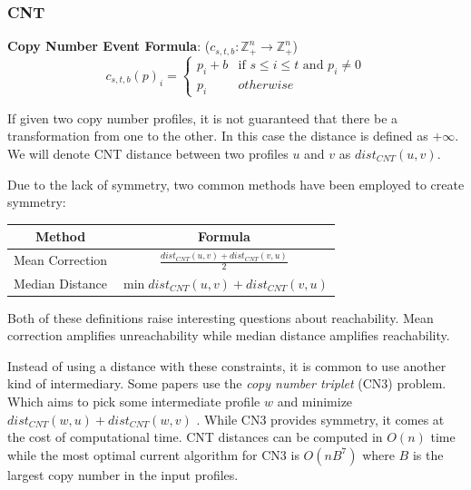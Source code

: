 \subsubsection{CNT}

\newcommand{\cnt}{dist_{CNT}}
\newcommand{\zcnt}{dist_{ZCNT}}

{\bf Copy Number Event Formula}: ($c_{s, t, b}: \mathbb{Z}_+^n \rightarrow \mathbb{Z}_+^n$) 
\begin{equation}
    c_{s, t, b}(p)_i = \begin{cases}
        p_i + b & \text{if } s \leq i \leq t \text{ and } p_i \neq 0 \\ 
        p_i & otherwise
    \end{cases}
\end{equation}

If given two copy number profiles, it is not guaranteed that there be a transformation from one to the other. In this case the distance is defined as $+\infty$. We will denote CNT distance between two profiles $u$ and $v$ as $\cnt(u, v)$.

Due to the lack of symmetry, two common methods have been employed to create symmetry: \vspace{5pt}

\def\arraystretch{2}

\begin{tabular}{|c|c|}
    \hline
    {\bf Method} & {\bf Formula} \\  \hline \hline
    Mean Correction & $\frac{\cnt (u, v) + \cnt (v, u)}{2}$ \\ \hline
    Median Distance & $\min \cnt (u, v) + \cnt (v, u)$ \\ \hline
\end{tabular}

\vspace{5pt}

Both of these definitions raise interesting questions about reachability. Mean correction amplifies unreachability while median distance amplifies reachability. 

Instead of using a distance with these constraints, it is common to use another kind of intermediary. Some papers use the {\it copy number triplet\/} (CN3) problem. Which aims to pick some intermediate profile $w$ and minimize $\cnt(w, u) + \cnt (w, v)$ \cite{triplet_algorithm}. While CN3 provides symmetry, it comes at the cost of computational time. CNT distances can be computed in $O(n)$ time \cite{linear_cnt} while the most optimal current algorithm for CN3 is $O(nB^7)$ where $B$ is the largest copy number in the input profiles. 

